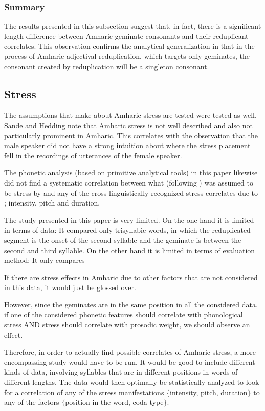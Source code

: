 \documentclass[12pt]{article}
\begin{document}
\subsubsection{Summary}

The results presented in this subsection suggest that, in fact, there is a significant length difference between Amharic geminate consonants and their reduplicant correlates. This observation confirms the analytical generalization in \cite{sande2017} that in the process of Amharic adjectival reduplication, which targets only geminates, the consonant created by reduplication will be a singleton consonant.



\subsection{Stress}

The assumptions that \cite{sande2017} make about Amharic stress are tested were tested as well. Sande and Hedding note that Amharic stress is not well described and also not particularly prominent in Amharic. This correlates with the observation that the male speaker did not have a strong intuition about where the stress placement fell in the recordings of utterances of the female speaker.

The phonetic analysis (based on primitive analytical tools) in this paper likewise did not find a systematic correlation between what (following \cite{leslau-amharic-grammar}) was assumed to be stress by \cite{sande2017} and any of the cross-linguistically recognized stress correlates due to \cite{hayes1995}; intensity, pitch and duration.

The study presented in this paper is very limited. On the one hand it is limited in terms of data: It compared only trisyllabic words, in which the reduplicated segment is the onset of the second syllable and the geminate is between the second and third syllable. On the other hand it is limited in terms of evaluation method: It only compares 

If there are stress effects in Amharic due to other factors that are not considered in this data, it would just be glossed over. 

However, since the geminates are in the same position in all the considered data, if one of the considered phonetic features should correlate with phonological stress AND stress should correlate with prosodic weight, we should observe an effect. 

Therefore, in order to actually find possible correlates of Amharic stress, a more encompassing study would have to be run. It would be good to include different kinds of data, involving syllables that are in different positions in words of different lengths. The data would then optimally be statistically analyzed to look for a correlation of any of the stress manifestations $\{$intensity, pitch, duration$\}$ to any of the factors $\{$position in the word, coda type$\}$.
\end{document}
